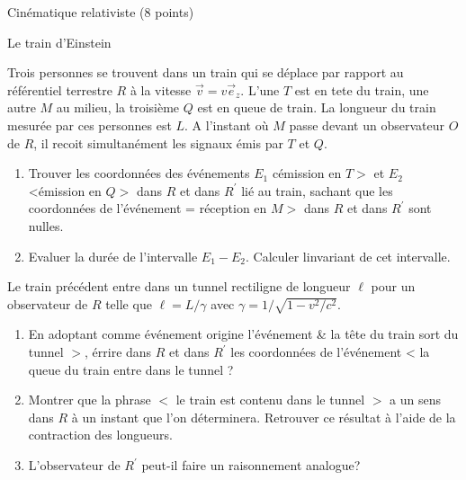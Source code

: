 \begin{exo}[PC][1][devoir]{Cinématique relativiste (8 points)}
\begin{quest}
  \end{quest}
  \end{exo}





\begin{exo}[PC][1][colle]{Le train d’Einstein}
  \begin{quest}
    \item Trois personnes se trouvent dans un train qui se déplace par rapport au référentiel terrestre $R$ à la vitesse $\vec{v}=v \vec{e}_z$. L'une $T$ est en tete du train, une autre $M$ au milieu, la troisième $Q$ est en queue de train. La longueur du train mesurée par ces personnes est $L$. A l'instant où $M$ passe devant un observateur $O$ de $R$, il recoit simultanément les signaux émis par $T$ et $Q$.
     \begin{enumerate}
      \item 
     Trouver les coordonnées des événements $E_1$ cémission en $T>$ et $E_2$ <émission en $Q>$ dans $R$ et dans $R^{\prime}$ lié au train, sachant que les coordonnées de l'événement = réception en $M>$ dans $R$ et dans $R^{\prime}$ sont nulles.
      \item Evaluer la durée de l'intervalle $E_1-E_2$. Calculer linvariant de cet intervalle.
    \end{enumerate}
\item Le train précédent entre dans un tunnel rectiligne de longueur $\ell$ pour un observateur de $R$ telle que $\ell=L / \gamma$ avec $\gamma=1 / \sqrt{1-v^2 / c^2}$.
\begin{enumerate}
  \item En adoptant comme événement origine l'événement \& la tête du train sort du tunnel $>$, érrire dans $R$ et dans $R^{\prime}$ les coordonnées de l'événement < la queue du train entre dans le tunnel ?
  \item Montrer que la phrase $<$ le train est contenu dans le tunnel $>$ a un sens dans $R$ à un instant que l'on déterminera. Retrouver ce résultat à l'aide de la contraction des longueurs.
  \item L'observateur de $R^{\prime}$ peut-il faire un raisonnement analogue?
\end{enumerate}
\end{quest}
\end{exo}


